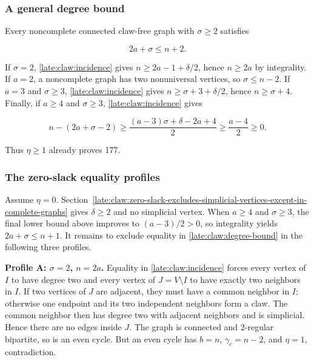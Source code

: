 \documentclass[11pt,a4paper]{article}
\theoremstyle{definition}\newtheorem{definition}[theorem]{Definition}
\theoremstyle{remark}\newtheorem{remark}[theorem]{Remark}
\begin{document}
\subsubsection{A general degree bound}\label{late:claw:a-general-degree-bound}

Every noncomplete connected claw-free graph with \(\sigma\ge2\)
satisfies

\begin{equation}\label{late:claw:degree-bound}
 2a+\sigma\le n+2.
\end{equation}

If \(\sigma=2\), \eqref{late:claw:incidence} gives \(n\ge2a-1+\delta/2\), hence \(n\ge2a\) by
integrality. If \(a=2\), a noncomplete graph has two nonuniversal
vertices, so \(\sigma\le n-2\). If \(a=3\) and \(\sigma\ge3\), \eqref{late:claw:incidence} gives
\(n\ge\sigma+3+\delta/2\), hence \(n\ge\sigma+4\). Finally, if \(a\ge4\)
and \(\sigma\ge3\), \eqref{late:claw:incidence} gives

\[n-(2a+\sigma-2)\ge\frac{(a-3)\sigma+\delta-2a+4}{2}\ge\frac{a-4}{2}\ge0.\]

Thus \(\eta\ge1\) already proves 177.

\subsubsection{The zero-slack equality
profiles}\label{late:claw:the-zero-slack-equality-profiles}

Assume \(\eta=0\). Section~\ref{late:claw:zero-slack-excludes-simplicial-vertices-except-in-complete-graphs} gives \(\delta\ge2\) and no simplicial
vertex. When \(a\ge4\) and \(\sigma\ge3\), the final lower bound above
improves to \((a-3)/2>0\), so integrality yields \(2a+\sigma\le n+1\).
It remains to exclude equality in \eqref{late:claw:degree-bound} in the following three profiles.

\textbf{Profile A: \(\sigma=2\), \(n=2a\).} Equality in \eqref{late:claw:incidence} forces every
vertex of \(I\) to have degree two and every vertex of
\(J=V\setminus I\) to have exactly two neighbors in \(I\). If two
vertices of \(J\) are adjacent, they must have a common neighbor in
\(I\); otherwise one endpoint and its two independent neighbors form a
claw. The common neighbor then has degree two with adjacent neighbors
and is simplicial. Hence there are no edges inside \(J\). The graph is
connected and 2-regular bipartite, so is an even cycle. But an even
cycle has \(b=n\), \(\gamma_c=n-2\), and \(\eta=1\), contradiction.
\end{document}
